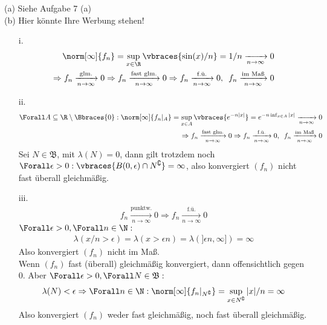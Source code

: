\begin{solution}

(a) Siehe Aufgabe 7 (a) \\

(b) Hier könnte Ihre Werbung stehen!

\begin{itemize}

  \item[i.]
  \begin{align*}
     \norm[\infty]{f_n}
     =
     \sup_{x \in \R} \vbraces{\sin(x)/n}
     =
     1/n
     \xrightarrow[n \to \infty]{} 0 \\
     \Rightarrow
     f_n \xrightarrow[n \to \infty]{\text{glm.}} 0
     \Rightarrow
     f_n \xrightarrow[n \to \infty]{\text{fast glm.}} 0
     \Rightarrow
     f_n \xrightarrow[n \to \infty]{\text{f.ü.}} 0,
     \enspace
     f_n \xrightarrow[n \to \infty]{\text{im Maß}} 0
   \end{align*}

  \item[ii.]
  \begin{align*}
    \Forall A \subseteq \R \setminus \Bbraces{0}:
    \norm[\infty]{f_n|_A}
    =
    \sup_{x \in A} \vbraces{e^{-n |x|}}
    =
    e^{-n \inf_{x \in A} |x|}
    \xrightarrow[n \to \infty]{} 0 \\
    \Rightarrow
    f_n \xrightarrow[n \to \infty]{\text{fast glm.}} 0
    \Rightarrow
    f_n \xrightarrow[n \to \infty]{\text{f.ü.}} 0,
    \enspace
    f_n \xrightarrow[n \to \infty]{\text{im Maß}} 0
  \end{align*}
  Sei $N \in \mathfrak{B}$, mit $\lambda(N) = 0$, dann gilt trotzdem noch $\Forall \epsilon > 0: \vbraces{B(0, \epsilon) \cap N^\complement} = \infty$, also konvergiert $(f_n)$ nicht fast überall gleichmäßig.

  \item[iii.]
  \begin{align*}
    f_n \xrightarrow[n \to \infty]{\text{punktw.}} 0
    \Rightarrow
    f_n \xrightarrow[n \to \infty]{\text{f.ü.}} 0
  \end{align*}
  $\Forall \epsilon > 0, \Forall n \in \N:$
  \begin{align*}
    \lambda(x/n > \epsilon)
    =
    \lambda(x > \epsilon n)
    =
    \lambda(]\epsilon n, \infty])
    =
    \infty
  \end{align*}
  Also konvergiert $(f_n)$ nicht im Maß. \\
  Wenn $(f_n)$ fast (überall) gleichmäßig konvergiert, dann offensichtlich gegen $0$. Aber $\Forall \epsilon > 0, \Forall N \in \mathfrak{B}:$
  \begin{align*}
    \lambda(N) < \epsilon
    \Rightarrow
    \Forall n \in \N:
    \norm[\infty]{f_n|_{N^\complement}}
    =
    \sup_{x \in N^\complement} |x|/n
    =
    \infty
  \end{align*}
  Also konvergiert $(f_n)$ weder fast gleichmäßig, noch fast überall gleichmäßig. \\


\end{itemize}
\end{solution}
